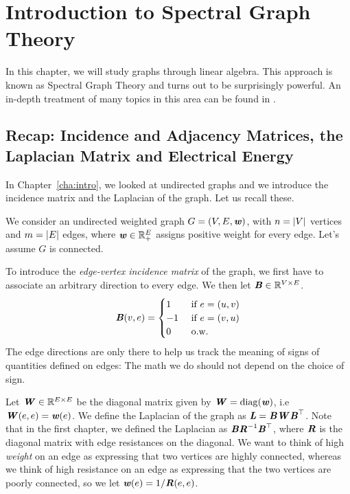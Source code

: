 
\chapter{Introduction to Spectral Graph Theory}



%
\sloppy

In this chapter, we will study graphs through linear algebra. This
approach is known as Spectral Graph Theory and turns out to be
surprisingly powerful.
An in-depth treatment of many topics in this area can be found in \cite{S19}.

\section{Recap: Incidence and Adjacency Matrices, the Laplacian
  Matrix and Electrical Energy}

In Chapter~\ref{cha:intro}, we looked at undirected graphs and we introduce the
incidence matrix and the Laplacian of the graph. Let us recall these.

We consider an undirected weighted graph $G=(V, E, \boldsymbol{\mathit{w}})$, with
$n=\left|V \right|$ vertices and $m = \left|E \right|$ edges, where $\boldsymbol{\mathit{w}} \in
\mathbb{R}_+^E$ assigns positive weight for every edge.
Let's assume $G$ is connected.

To introduce the \emph{edge-vertex incidence matrix} of the graph,
we first have to associate an arbitrary direction to every edge.
We then let
$\boldsymbol{\mathit{B}} \in \mathbb{R}^{V \times E}$.
\[
  \boldsymbol{\mathit{B}}(v,e) =
  \begin{cases}
    1 & \text{ if } e = (u,v) \\
    -1 &\text{ if } e = (v,u) \\
    0 &\text{ o.w.}
  \end{cases}
\]
The edge directions are only there to help us track the meaning of signs of
quantities defined on edges: The math we do should not depend on the
choice of sign.

Let $\boldsymbol{\mathit{W}} \in \mathbb{R}^{E \times E}$ be the diagonal matrix given by $\boldsymbol{\mathit{W}} =
\operatorname*{diag}(\boldsymbol{\mathit{w}})$, i.e $\boldsymbol{\mathit{W}}(e,e) = \boldsymbol{\mathit{w}}(e)$.
We define the Laplacian of the graph as $\boldsymbol{\mathit{L}} = \boldsymbol{\mathit{B}}\boldsymbol{\mathit{W}}\boldsymbol{\mathit{B}}^{\top}$.
Note that in the first chapter, we defined the Laplacian as
$\boldsymbol{\mathit{B}}\boldsymbol{\mathit{R}}^{-1}\boldsymbol{\mathit{B}}^{\top}$,
where $\boldsymbol{\mathit{R}}$ is the diagonal matrix with edge resistances on the
diagonal.
We want to think of high \emph{weight} on an edge as expressing that two
vertices are highly connected, whereas we think of high resistance on
an edge as expressing that the two vertices are poorly connected, so
we let $\boldsymbol{\mathit{w}}(e) = 1/\boldsymbol{\mathit{R}}(e,e)$.

